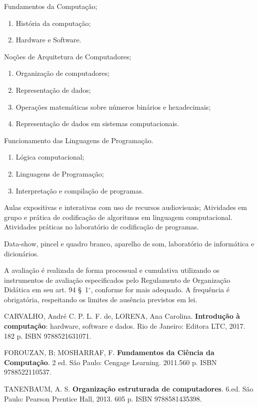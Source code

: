 \begin{pud}
\begin{description}[itemsep=0em]
	   \item[UNIDADE II:] Fundamentos da Computação;
	   \begin{enumerate}[itemsep=0em, topsep=0em]
	     \item História da computação;
	     \item Hardware e Software.
	   \end{enumerate}
	   
	    \item[UNIDADE III:]  Noções de Arquitetura de Computadores;
	   \begin{enumerate}[itemsep=0em, topsep=0em]
	     \item Organização de computadores;
	     \item Representação de dados;
	     \item Operações matemáticas sobre números binários e hexadecimais;
	     \item Representação de dados em sistemas computacionais.
	   \end{enumerate}
	   
	   	    
	    \item[UNIDADE IV:] Funcionamento das Linguagens de Programação.
	    \begin{enumerate}[itemsep=0em, topsep=0em]
	     \item Lógica computacional;
	     \item Linguagens de Programação;
	     \item Interpretação e compilação de programas.
	   \end{enumerate}
	   
	\end{description}
	
	
	\metodologia            	
       Aulas expositivas e interativas com uso de recursos audiovisuais;
       Atividades em grupo e prática de codificação de algoritmos em linguagem computacional.
       Atividades práticas no laboratório de codificação de programas.
	
	\recursos
	Data-show, pincel e quadro branco, aparelho de som, laboratório de informática e
dicionários.
	
\avaliacao A avaliação é realizada de forma processual e cumulativa utilizando
os instrumentos de avaliação especificados pelo Regulamento de Organização
Didática em seu art. 94 \S~1$^\circ$, conforme for mais adequado. A frequência é
obrigatória, respeitando os limites de ausência previstos em lei.
\naopresencial
	
	\begin{bibbasica}
		\item CARVALHO, André C. P. L. F. de, LORENA, Ana Carolina. \textbf{Introdução à
computação}: hardware, software e dados. Rio de Janeiro: Editora LTC, 2017. 182
p. ISBN 9788521631071.
		\item FOROUZAN, B; MOSHARRAF, F. \textbf{Fundamentos da Ciência da Computação}. 2
ed. São Paulo: Cengage Learning. 2011.560 p. ISBN 9788522110537.
		\item TANENBAUM, A. S. \textbf{Organização estruturada de computadores}. 6.ed. São
Paulo: Pearson Prentice Hall, 2013. 605 p. ISBN 9788581435398.
	 	 

\end{bibbasica}
\end{pud}
